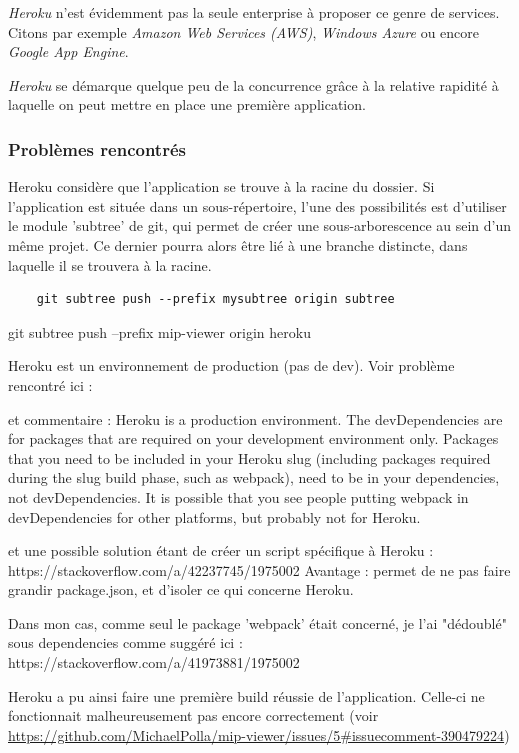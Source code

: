 \textit{Heroku} n'est évidemment pas la seule enterprise à proposer ce genre de services. Citons par exemple \textit{Amazon Web Services (AWS)}, \textit{Windows Azure} ou encore \textit{Google App Engine}.

\textit{Heroku} se démarque quelque peu de la concurrence grâce à la relative rapidité à laquelle on peut mettre en place une première application.


\subsubsection{Problèmes rencontrés}

Heroku considère que l'application se trouve à la racine du dossier.
Si l'application est située dans un sous-répertoire, l'une des possibilités est d'utiliser le module 'subtree' de git, qui permet de créer une sous-arborescence au sein d'un même projet. Ce dernier pourra alors être lié à une branche distincte, dans laquelle il se trouvera à la racine.
\begin{verbatim}
    git subtree push --prefix mysubtree origin subtree
\end{verbatim}

git subtree push --prefix mip-viewer origin heroku

Heroku est un environnement de production (pas de dev). Voir problème rencontré ici :

et commentaire :
Heroku is a production environment. The devDependencies are for packages that are required on your development environment only. Packages that you need to be included in your Heroku slug (including packages required during the slug build phase, such as webpack), need to be in your dependencies, not devDependencies. It is possible that you see people putting webpack in devDependencies for other platforms, but probably not for Heroku. 

et une possible solution étant de créer un script spécifique à Heroku : https://stackoverflow.com/a/42237745/1975002
Avantage : permet de ne pas faire grandir package.json, et d'isoler ce qui concerne Heroku.

Dans mon cas, comme seul le package 'webpack' était concerné, je l'ai "dédoublé" sous dependencies comme suggéré ici : https://stackoverflow.com/a/41973881/1975002

Heroku a pu ainsi faire une première build réussie de l'application. Celle-ci ne fonctionnait malheureusement pas encore correctement (voir \url{https://github.com/MichaelPolla/mip-viewer/issues/5\#issuecomment-390479224}) 


